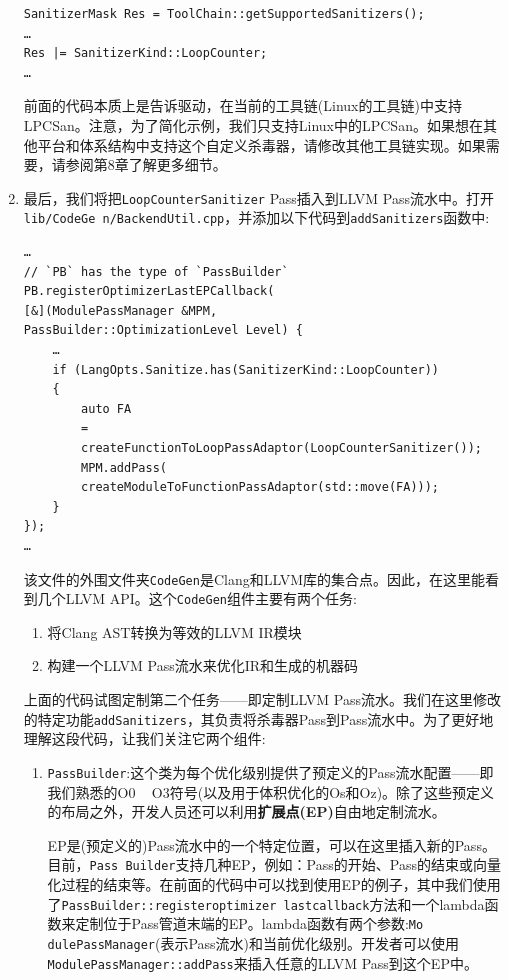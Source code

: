 \begin{enumerate}
\begin{lstlisting}[style=styleCXX]
SanitizerMask Res = ToolChain::getSupportedSanitizers();
…
Res |= SanitizerKind::LoopCounter;
…
\end{lstlisting}

前面的代码本质上是告诉驱动，在当前的工具链(Linux的工具链)中支持LPCSan。注意，为了简化示例，我们只支持Linux中的LPCSan。如果想在其他平台和体系结构中支持这个自定义杀毒器，请修改其他工具链实现。如果需要，请参阅第8章了解更多细节。


\item 最后，我们将把\texttt{LoopCounterSanitizer} Pass插入到LLVM Pass流水中。打开\texttt{lib/CodeGe n/BackendUtil.cpp}，并添加以下代码到\texttt{addSanitizers}函数中:

\begin{lstlisting}[style=styleCXX]
…
// `PB` has the type of `PassBuilder`
PB.registerOptimizerLastEPCallback(
[&](ModulePassManager &MPM,
PassBuilder::OptimizationLevel Level) {
	…
	if (LangOpts.Sanitize.has(SanitizerKind::LoopCounter))
	{
		auto FA
		=
		createFunctionToLoopPassAdaptor(LoopCounterSanitizer());
		MPM.addPass(
		createModuleToFunctionPassAdaptor(std::move(FA)));
	}
});
…
\end{lstlisting}

该文件的外围文件夹\texttt{CodeGen}是Clang和LLVM库的集合点。因此，在这里能看到几个LLVM API。这个\texttt{CodeGen}组件主要有两个任务:

\begin{enumerate}[label=\alph*.]
\item 将Clang AST转换为等效的LLVM IR模块
\item 构建一个LLVM Pass流水来优化IR和生成的机器码
\end{enumerate}

上面的代码试图定制第二个任务——即定制LLVM Pass流水。我们在这里修改的特定功能\texttt{addSanitizers}，其负责将杀毒器Pass到Pass流水中。为了更好地理解这段代码，让我们关注它两个组件:

\begin{enumerate}[label=\roman*.]
\item \texttt{PassBuilder}:这个类为每个优化级别提供了预定义的Pass流水配置——即我们熟悉的O0 ~ O3符号(以及用于体积优化的Os和Oz)。除了这些预定义的布局之外，开发人员还可以利用\textbf{扩展点(EP)}自由地定制流水。

EP是(预定义的)Pass流水中的一个特定位置，可以在这里插入新的Pass。目前，\texttt{Pass Builder}支持几种EP，例如：Pass的开始、Pass的结束或向量化过程的结束等。在前面的代码中可以找到使用EP的例子，其中我们使用了\texttt{PassBuilder::registeroptimizer lastcallback}方法和一个lambda函数来定制位于Pass管道末端的EP。lambda函数有两个参数:\texttt{Mo dulePassManager}(表示Pass流水)和当前优化级别。开发者可以使用\texttt{ModulePassManager::addPass}来插入任意的LLVM Pass到这个EP中。


\end{enumerate}
\end{enumerate}
